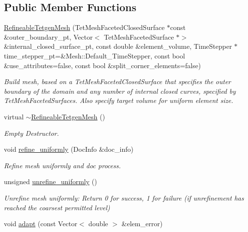 \subsection*{Public Member Functions}
\begin{DoxyCompactItemize}
\item 
\hyperlink{classoomph_1_1RefineableTetgenMesh_a9ac439f3e1825013c81098e0fa35733b}{Refineable\+Tetgen\+Mesh} (Tet\+Mesh\+Faceted\+Closed\+Surface $\ast$const \&outer\+\_\+boundary\+\_\+pt, Vector$<$ Tet\+Mesh\+Faceted\+Surface $\ast$$>$ \&internal\+\_\+closed\+\_\+surface\+\_\+pt, const double \&element\+\_\+volume, Time\+Stepper $\ast$time\+\_\+stepper\+\_\+pt=\&Mesh\+::\+Default\+\_\+\+Time\+Stepper, const bool \&use\+\_\+attributes=false, const bool \&split\+\_\+corner\+\_\+elements=false)
\begin{DoxyCompactList}\small\item\em Build mesh, based on a Tet\+Mesh\+Faceted\+Closed\+Surface that specifies the outer boundary of the domain and any number of internal closed curves, specified by Tet\+Mesh\+Faceted\+Surfaces. Also specify target volume for uniform element size. \end{DoxyCompactList}\item 
virtual \hyperlink{classoomph_1_1RefineableTetgenMesh_ac2ac6c6961647d0f332a6742f52dd27d}{$\sim$\+Refineable\+Tetgen\+Mesh} ()
\begin{DoxyCompactList}\small\item\em Empty Destructor. \end{DoxyCompactList}\item 
void \hyperlink{classoomph_1_1RefineableTetgenMesh_a5ddc94b2545c82bfb2795583f9b98db2}{refine\+\_\+uniformly} (Doc\+Info \&doc\+\_\+info)
\begin{DoxyCompactList}\small\item\em Refine mesh uniformly and doc process. \end{DoxyCompactList}\item 
unsigned \hyperlink{classoomph_1_1RefineableTetgenMesh_add609c3184ffa1786e183f4c6dc24a57}{unrefine\+\_\+uniformly} ()
\begin{DoxyCompactList}\small\item\em Unrefine mesh uniformly\+: Return 0 for success, 1 for failure (if unrefinement has reached the coarsest permitted level) \end{DoxyCompactList}\item 
void \hyperlink{classoomph_1_1RefineableTetgenMesh_ad75ff5f1e088e611311c3f6a30feea5b}{adapt} (const Vector$<$ double $>$ \&elem\+\_\+error)
$$
\end{DoxyCompactItemize}

